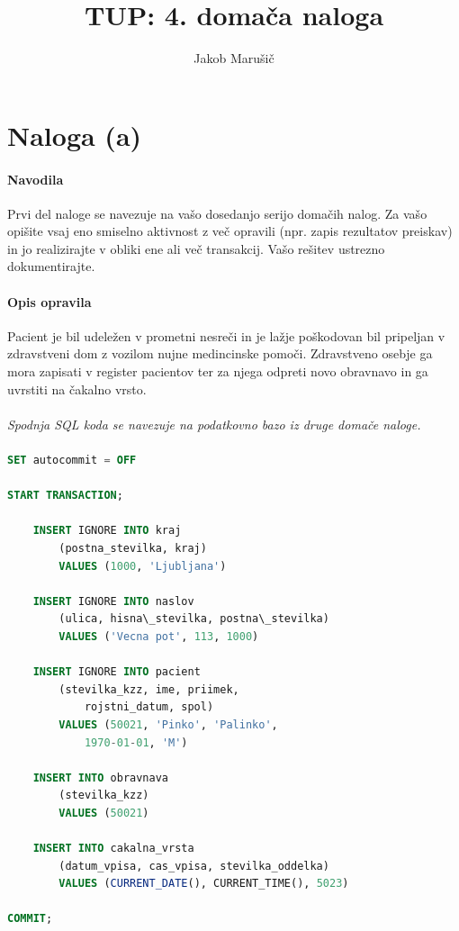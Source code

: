 \documentclass[a4paper,11pt]{report}
\begin{document}
\title{TUP: 4. domača naloga}
\author{Jakob Marušič}
\maketitle

\section*{Naloga (a)}

\paragraph{Navodila}
\begin{em}
    Prvi del naloge se navezuje na vašo dosedanjo serijo domačih nalog. Za vašo  opišite vsaj eno smiselno aktivnost z več opravili (npr. zapis rezultatov preiskav) in jo realizirajte v obliki ene ali več transakcij. Vašo rešitev ustrezno dokumentirajte.
\end{em}

\paragraph{Opis opravila} Pacient je bil udeležen v prometni nesreči in je lažje poškodovan bil pripeljan v zdravstveni dom z
vozilom nujne medincinske pomoči. Zdravstveno osebje ga mora zapisati v register pacientov ter za njega odpreti novo obravnavo in ga uvrstiti na čakalno vrsto.
\\\\\textit{Spodnja SQL koda se navezuje na podatkovno bazo iz druge domače naloge.}

\paragraph{}\mbox{}
\begin{lstlisting}[language=SQL]
SET autocommit = OFF

START TRANSACTION;
    
    INSERT IGNORE INTO kraj 
        (postna_stevilka, kraj) 
        VALUES (1000, 'Ljubljana')

    INSERT IGNORE INTO naslov 
        (ulica, hisna\_stevilka, postna\_stevilka) 
        VALUES ('Vecna pot', 113, 1000)
    
    INSERT IGNORE INTO pacient 
        (stevilka_kzz, ime, priimek, 
            rojstni_datum, spol) 
        VALUES (50021, 'Pinko', 'Palinko', 
            1970-01-01, 'M')
    
    INSERT INTO obravnava 
        (stevilka_kzz) 
        VALUES (50021)

    INSERT INTO cakalna_vrsta 
        (datum_vpisa, cas_vpisa, stevilka_oddelka) 
        VALUES (CURRENT_DATE(), CURRENT_TIME(), 5023)

COMMIT;
\end{lstlisting}
\end{document}
